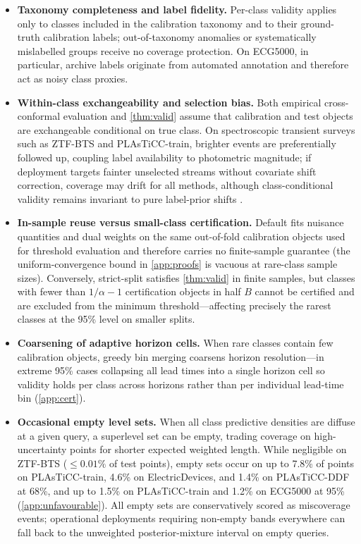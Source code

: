 \begin{itemize}
\item \textbf{Taxonomy completeness and label fidelity.} Per-class validity applies only to classes included in the calibration taxonomy and to their ground-truth calibration labels; out-of-taxonomy anomalies or systematically mislabelled groups receive no coverage protection. On ECG5000, in particular, archive labels originate from automated annotation and therefore act as noisy class proxies.
\item \textbf{Within-class exchangeability and selection bias.} Both empirical cross-conformal evaluation and \cref{thm:valid} assume that calibration and test objects are exchangeable conditional on true class. On spectroscopic transient surveys such as ZTF-BTS and PLAsTiCC-train, brighter events are preferentially followed up, coupling label availability to photometric magnitude; if deployment targets fainter unselected streams without covariate shift correction, coverage may drift for all methods, although class-conditional validity remains invariant to pure label-prior shifts \citep{podkopaev2021distribution}.
\item \textbf{In-sample reuse versus small-class certification.} Default \gamut{} fits nuisance quantities and dual weights on the same out-of-fold calibration objects used for threshold evaluation and therefore carries no finite-sample guarantee (the uniform-convergence bound in \cref{app:proofs} is vacuous at rare-class sample sizes). Conversely, strict-split \gamut{} satisfies \cref{thm:valid} in finite samples, but classes with fewer than $1/\alpha-1$ certification objects in half $B$ cannot be certified and are excluded from the minimum threshold---affecting precisely the rarest classes at the 95\% level on smaller splits.
\item \textbf{Coarsening of adaptive horizon cells.} When rare classes contain few calibration objects, greedy bin merging coarsens horizon resolution---in extreme 95\% cases collapsing all lead times into a single horizon cell so validity holds per class across horizons rather than per individual lead-time bin (\cref{app:cert}).
\item \textbf{Occasional empty level sets.} When all class predictive densities are diffuse at a given query, a superlevel set can be empty, trading coverage on high-uncertainty points for shorter expected weighted length. While negligible on ZTF-BTS ($\le0.01\%$ of test points), empty sets occur on up to 7.8\% of points on PLAsTiCC-train, 4.6\% on ElectricDevices, and 1.4\% on PLAsTiCC-DDF at 68\%, and up to 1.5\% on PLAsTiCC-train and 1.2\% on ECG5000 at 95\% (\cref{app:unfavourable}). All empty sets are conservatively scored as miscoverage events; operational deployments requiring non-empty bands everywhere can fall back to the unweighted posterior-mixture interval on empty queries.

\end{itemize}
